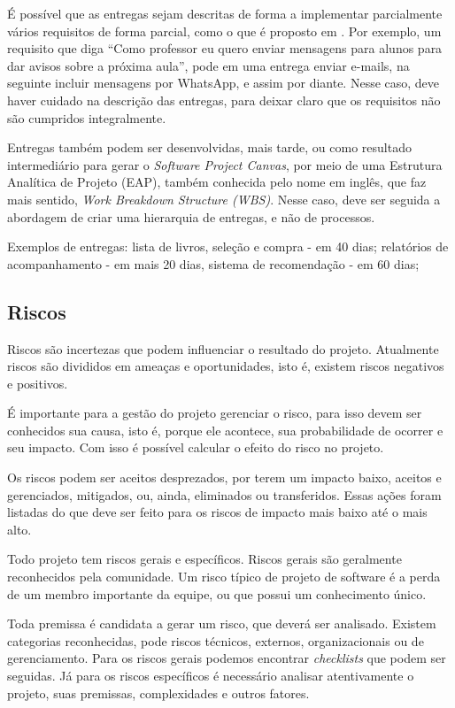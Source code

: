 \documentclass{article}
\begin{document}
É possível que as entregas sejam descritas de forma a implementar parcialmente vários requisitos de forma parcial, como o que é proposto em \citep{jacobson:2011:uc2p0}. Por exemplo, um requisito que diga ``Como professor eu quero enviar mensagens para alunos para dar avisos sobre a próxima aula'', pode em uma entrega enviar e-mails, na seguinte incluir mensagens por WhatsApp, e assim por diante. Nesse caso, deve haver cuidado na descrição das entregas, para deixar claro que os requisitos não são cumpridos integralmente.

Entregas também podem ser desenvolvidas, mais tarde, ou como resultado intermediário para gerar o \textit{Software Project Canvas}, por meio de uma Estrutura Analítica de Projeto (EAP), também conhecida pelo nome em inglês, que faz mais sentido, \textit{Work Breakdown Structure (WBS)}. Nesse caso, deve ser seguida a abordagem de criar uma hierarquia de entregas, e não de processos.

Exemplos de entregas: lista de livros, seleção e compra - em 40 dias; relatórios de acompanhamento - em mais 20 dias, sistema de recomendação - em 60 dias; 

\subsection{Riscos}

Riscos são incertezas que podem influenciar o resultado do projeto. Atualmente riscos são divididos em ameaças e oportunidades, isto é, existem riscos negativos e positivos.


É importante para a gestão do projeto gerenciar o risco, para isso devem ser conhecidos sua causa, isto é, porque ele acontece, sua probabilidade de ocorrer e seu impacto. Com isso é possível calcular o efeito do risco no projeto.

Os riscos podem ser aceitos desprezados, por terem um impacto baixo, aceitos e gerenciados, mitigados, ou, ainda, eliminados ou transferidos. Essas ações foram listadas do que deve ser feito para os riscos de impacto mais baixo até o mais alto. 

Todo projeto tem riscos gerais e específicos. Riscos gerais são geralmente reconhecidos pela comunidade. Um risco típico de projeto de software é a perda de um membro importante da equipe, ou que possui um conhecimento único.


Toda premissa é candidata a gerar um risco, que deverá ser analisado. Existem categorias reconhecidas, pode riscos técnicos, externos, organizacionais ou de gerenciamento\citep{pmbok:6}. 
Para os riscos gerais podemos encontrar \textit{checklists} que podem ser seguidas. Já para os riscos específicos é necessário analisar atentivamente o projeto, suas premissas, complexidades e outros fatores. 
\end{document}

